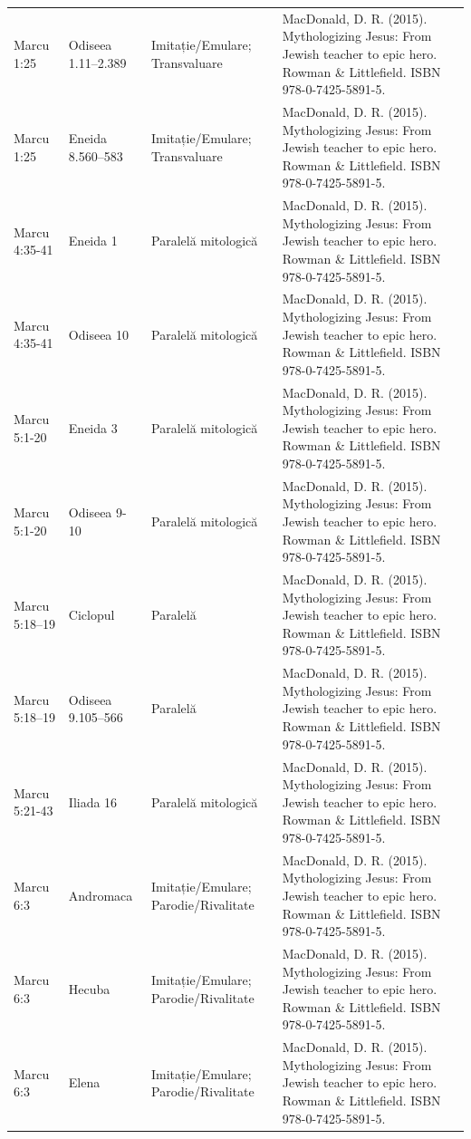 \documentclass[12pt,a4paper,twoside,openany]{book}
\begin{document}
\begin{longtable}{L{1.4cm}L{1.7cm}L{3.1cm}L{8.4cm}}
Marcu 1:25 & Odiseea 1.11–2.389 & Imitație/Emulare; Transvaluare & MacDonald, D. R. (2015). Mythologizing Jesus: From Jewish teacher to epic hero. Rowman \& Littlefield. ISBN 978-0-7425-5891-5. \\
Marcu 1:25 & Eneida 8.560–583 & Imitație/Emulare; Transvaluare & MacDonald, D. R. (2015). Mythologizing Jesus: From Jewish teacher to epic hero. Rowman \& Littlefield. ISBN 978-0-7425-5891-5. \\
Marcu 4:35-41 & Eneida 1 & Paralelă mitologică & MacDonald, D. R. (2015). Mythologizing Jesus: From Jewish teacher to epic hero. Rowman \& Littlefield. ISBN 978-0-7425-5891-5. \\
Marcu 4:35-41 & Odiseea 10 & Paralelă mitologică & MacDonald, D. R. (2015). Mythologizing Jesus: From Jewish teacher to epic hero. Rowman \& Littlefield. ISBN 978-0-7425-5891-5. \\
Marcu 5:1-20 & Eneida 3 & Paralelă mitologică & MacDonald, D. R. (2015). Mythologizing Jesus: From Jewish teacher to epic hero. Rowman \& Littlefield. ISBN 978-0-7425-5891-5. \\
Marcu 5:1-20 & Odiseea 9-10 & Paralelă mitologică & MacDonald, D. R. (2015). Mythologizing Jesus: From Jewish teacher to epic hero. Rowman \& Littlefield. ISBN 978-0-7425-5891-5. \\
Marcu 5:18–19 & Ciclopul & Paralelă & MacDonald, D. R. (2015). Mythologizing Jesus: From Jewish teacher to epic hero. Rowman \& Littlefield. ISBN 978-0-7425-5891-5. \\
Marcu 5:18–19 & Odiseea 9.105–566 & Paralelă & MacDonald, D. R. (2015). Mythologizing Jesus: From Jewish teacher to epic hero. Rowman \& Littlefield. ISBN 978-0-7425-5891-5. \\
Marcu 5:21-43 & Iliada 16 & Paralelă mitologică & MacDonald, D. R. (2015). Mythologizing Jesus: From Jewish teacher to epic hero. Rowman \& Littlefield. ISBN 978-0-7425-5891-5. \\
Marcu 6:3 & Andromaca & Imitație/Emulare; Parodie/Rivalitate & MacDonald, D. R. (2015). Mythologizing Jesus: From Jewish teacher to epic hero. Rowman \& Littlefield. ISBN 978-0-7425-5891-5. \\
Marcu 6:3 & Hecuba & Imitație/Emulare; Parodie/Rivalitate & MacDonald, D. R. (2015). Mythologizing Jesus: From Jewish teacher to epic hero. Rowman \& Littlefield. ISBN 978-0-7425-5891-5. \\
Marcu 6:3 & Elena & Imitație/Emulare; Parodie/Rivalitate & MacDonald, D. R. (2015). Mythologizing Jesus: From Jewish teacher to epic hero. Rowman \& Littlefield. ISBN 978-0-7425-5891-5. \\

\end{longtable}
\end{document}

